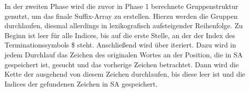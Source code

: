 In der zweiten Phase wird die zuvor in Phase 1 berechnete Gruppenstruktur genutzt, um das finale Suffix-Array zu erstellen. 
Hierzu werden die Gruppen durchlaufen, diesmal allerdings in lexikografisch aufsteigender Reihenfolge.
Zu Beginn ist \sa leer für alle Indices, bis auf die erste Stelle, an der der Index des Terminationssymbols \$ steht.
Anschließend wird über \sa iteriert.
Dazu wird in jedem Durchlauf das Zeichen des originalen Wortes an der Position, die in SA gespeichert ist, gesucht und das vorherige Zeichen betrachtet. 
Dann wird die Kette der \prevpointer ausgehend von diesem Zeichen durchlaufen, bis diese leer ist und die Indices der gefundenen Zeichen in SA gespeichert. 